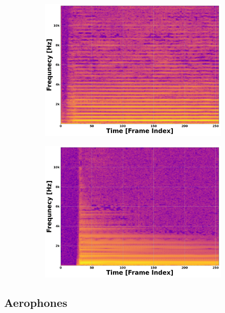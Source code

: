\documentclass[12pt,letterpaper]{article}
\begin{document}
\begin{figure}[H]
	\begin{subfigure}{0.45\textwidth}
	\centering
	\includegraphics[scale=0.18]{../FiguresSpectrogram/CELLO-F4}
	\end{subfigure}
	\begin{subfigure}{0.45\textwidth}
	\centering
	\includegraphics[scale=0.18]{../FiguresSpectrogram/Guitar-B2}
	\end{subfigure}
\end{figure}



\subsection{Aerophones}
\label{subsec-Aerophones}
\end{document}

